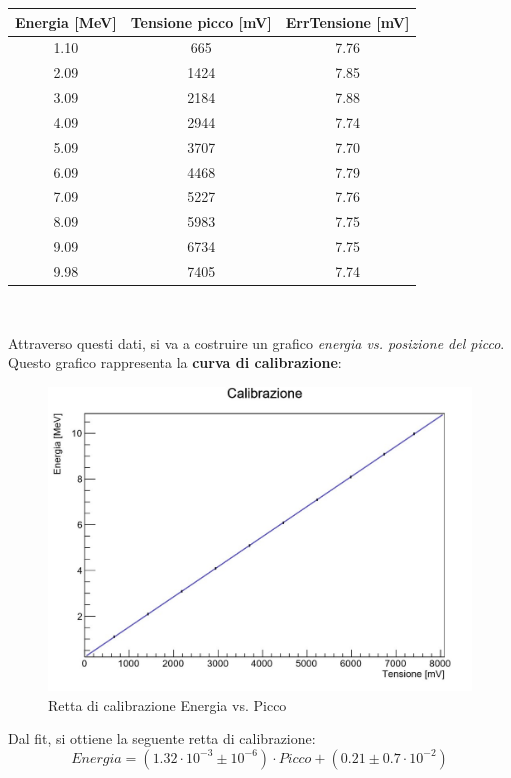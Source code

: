 \documentclass[a4paper,10pt]{article}
\begin{document}
\begin{center}
\begin{tabular}{ccc}
\toprule
Energia [MeV] & Tensione picco [mV] & ErrTensione [mV]\\
\midrule
1.10 & 665 & 7.76\\
2.09 & 1424 & 7.85\\
3.09 & 2184 & 7.88\\
4.09 & 2944 & 7.74\\
5.09 & 3707 & 7.70\\
6.09 & 4468 & 7.79\\
7.09 & 5227 & 7.76\\
8.09 & 5983 & 7.75\\
9.09 & 6734 & 7.75\\
9.98 & 7405 & 7.74\\
\bottomrule
\end{tabular}\\
\end{center}

Attraverso questi dati, si va a costruire un grafico \textit{energia vs. posizione del picco}. Questo grafico rappresenta la \textbf{curva di calibrazione}:\\

\begin{figure}[h!]
\centering
\includegraphics[scale=0.5]{rettacalibrazione.jpg}
\caption{Retta di calibrazione Energia vs. Picco}
\end{figure}

Dal fit, si ottiene la seguente retta di calibrazione:
\[
Energia = (1.32\cdot10^{-3} \pm 10^{-6})\cdot Picco + (0.21 \pm 0.7\cdot10^{-2})
\]
\end{document}
